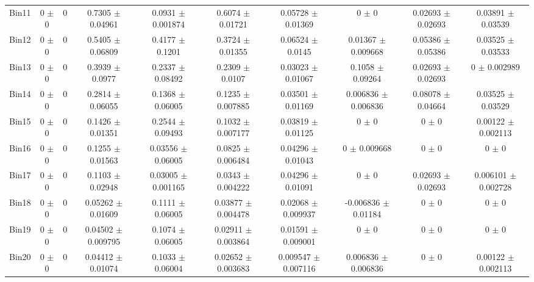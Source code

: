 \begin{tabular}{@{\extracolsep{4pt}}lccccccccc@{}}
     Bin11 & 0 $\pm$ 0 & 0 & 0.7305 $\pm$ 0.04961 & 0.0931 $\pm$ 0.001874 & 0.6074 $\pm$ 0.01721 & 0.05728 $\pm$ 0.01369 & 0 $\pm$ 0 & 0.02693 $\pm$ 0.02693 & 0.03891 $\pm$ 0.03539 \\ 
     Bin12 & 0 $\pm$ 0 & 0 & 0.5405 $\pm$ 0.06809 & 0.4177 $\pm$ 0.1201 & 0.3724 $\pm$ 0.01355 & 0.06524 $\pm$ 0.0145 & 0.01367 $\pm$ 0.009668 & 0.05386 $\pm$ 0.05386 & 0.03525 $\pm$ 0.03533 \\ 
     Bin13 & 0 $\pm$ 0 & 0 & 0.3939 $\pm$ 0.0977 & 0.2337 $\pm$ 0.08492 & 0.2309 $\pm$ 0.0107 & 0.03023 $\pm$ 0.01067 & 0.1058 $\pm$ 0.09264 & 0.02693 $\pm$ 0.02693 & 0 $\pm$ 0.002989 \\ 
     Bin14 & 0 $\pm$ 0 & 0 & 0.2814 $\pm$ 0.06055 & 0.1368 $\pm$ 0.06005 & 0.1235 $\pm$ 0.007885 & 0.03501 $\pm$ 0.01169 & 0.006836 $\pm$ 0.006836 & 0.08078 $\pm$ 0.04664 & 0.03525 $\pm$ 0.03529 \\ 
     Bin15 & 0 $\pm$ 0 & 0 & 0.1426 $\pm$ 0.01351 & 0.2544 $\pm$ 0.09493 & 0.1032 $\pm$ 0.007177 & 0.03819 $\pm$ 0.01125 & 0 $\pm$ 0 & 0 $\pm$ 0 & 0.00122 $\pm$ 0.002113 \\ 
     Bin16 & 0 $\pm$ 0 & 0 & 0.1255 $\pm$ 0.01563 & 0.03556 $\pm$ 0.06005 & 0.0825 $\pm$ 0.006484 & 0.04296 $\pm$ 0.01043 & 0 $\pm$ 0.009668 & 0 $\pm$ 0 & 0 $\pm$ 0 \\ 
     Bin17 & 0 $\pm$ 0 & 0 & 0.1103 $\pm$ 0.02948 & 0.03005 $\pm$ 0.001165 & 0.0343 $\pm$ 0.004222 & 0.04296 $\pm$ 0.01091 & 0 $\pm$ 0 & 0.02693 $\pm$ 0.02693 & 0.006101 $\pm$ 0.002728 \\ 
     Bin18 & 0 $\pm$ 0 & 0 & 0.05262 $\pm$ 0.01609 & 0.1111 $\pm$ 0.06005 & 0.03877 $\pm$ 0.004478 & 0.02068 $\pm$ 0.009937 & -0.006836 $\pm$ 0.01184 & 0 $\pm$ 0 & 0 $\pm$ 0 \\ 
     Bin19 & 0 $\pm$ 0 & 0 & 0.04502 $\pm$ 0.009795 & 0.1074 $\pm$ 0.06005 & 0.02911 $\pm$ 0.003864 & 0.01591 $\pm$ 0.009001 & 0 $\pm$ 0 & 0 $\pm$ 0 & 0 $\pm$ 0 \\ 
     Bin20 & 0 $\pm$ 0 & 0 & 0.04412 $\pm$ 0.01074 & 0.1033 $\pm$ 0.06004 & 0.02652 $\pm$ 0.003683 & 0.009547 $\pm$ 0.007116 & 0.006836 $\pm$ 0.006836 & 0 $\pm$ 0 & 0.00122 $\pm$ 0.002113 \\ 
\hline\hline
  \end{tabular}
